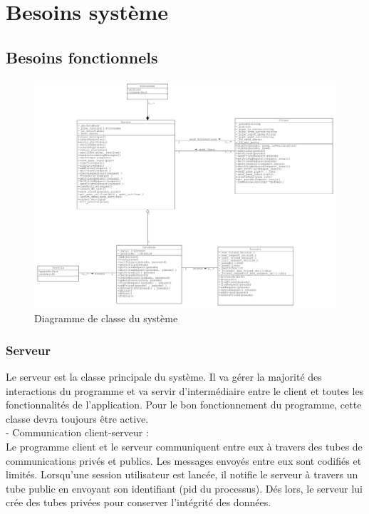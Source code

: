 \documentclass[a4paper,12pt]{article}
\begin{document}
\newpage

\section{Besoins système}
\subsection{Besoins fonctionnels}

\begin{figure}[h!]
\centering
\includegraphics[width=16cm]{images/newSystemClassDiagram.jpg}
\caption{Diagramme de classe du système}
\label{fig:UerUseCase}
\end{figure}

\subsubsection{Serveur}
Le serveur est la classe principale du système. Il va gérer la majorité des interactions du programme et va servir d'intermédiaire entre le client et toutes les fonctionnalités de l'application. Pour le bon fonctionnement du programme, cette classe devra toujours être active.\\

- Communication client-serveur : \\
Le programme client et le serveur communiquent entre eux à travers des tubes de communications privés et publics. Les messages envoyés entre eux sont codifiés et limités.
Lorsqu'une session utilisateur est lancée, il notifie le serveur à travers un tube public en envoyant son identifiant (pid du processus). 
Dés lors, le serveur lui crée des tubes privées pour conserver l'intégrité des données.\\
\end{document}
